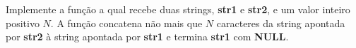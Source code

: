 
\question[10]

Implemente a função a qual recebe duas strings, \textbf{str1} e \textbf{str2}, e um valor inteiro positivo $N$. A função concatena não mais que $N$ caracteres da string apontada por \textbf{str2} à string apontada por \textbf{str1} e termina \textbf{str1} com \textbf{NULL}.